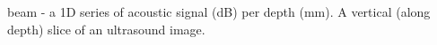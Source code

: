 beam - a 1D series of acoustic signal (dB) per depth (mm). A vertical (along depth) slice of an ultrasound image. 
